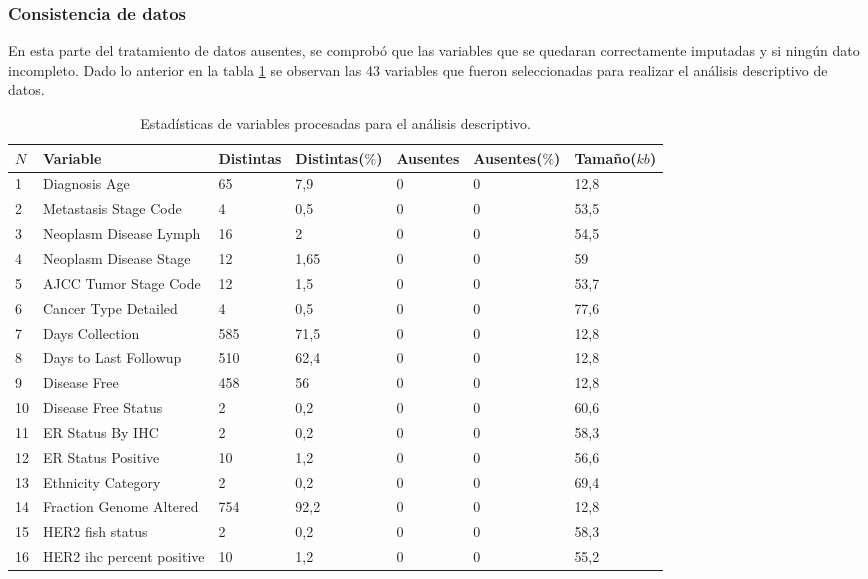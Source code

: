 \subsubsection{Consistencia de datos}
En esta parte del tratamiento de datos ausentes, se comprobó que las variables que se quedaran correctamente imputadas y si ningún dato incompleto. Dado lo anterior en la tabla \ref{data_limpia} se observan las 43 variables que fueron seleccionadas para realizar el análisis descriptivo de datos.
\begin{table}[hbt!]
	\footnotesize
	\centering
	\begin{threeparttable}
		\caption{Estadísticas de variables procesadas para el análisis descriptivo.}
		\label{data_limpia}
		\begin{tabular}{p{0.5cm} p{4cm} p{1.5cm} p{2cm} p{1.5cm} p{2cm} p{1.5cm}} \toprule
			$N$  &Variable &Distintas &Distintas($\%$) &Ausentes &Ausentes($\%$)  &Tamaño($kb$)
			\\ \hline	1	&	Diagnosis Age	&	65	&	7,9	&	0	&	0	&	12,8
			\\ \hline	2	&	Metastasis Stage Code	&	4	&	0,5	&	0	&	0	&	53,5
			\\ \hline	3	&	Neoplasm Disease Lymph 	&	16	&	2	&	0	&	0	&	54,5
			\\ \hline	4	&	Neoplasm Disease Stage 	&	12	&	1,65	&	0	&	0	&	59
			\\ \hline	5	&	AJCC Tumor Stage Code	&	12	&	1,5	&	0	&	0	&	53,7
			\\ \hline	6	&	Cancer Type Detailed	&	4	&	0,5	&	0	&	0	&	77,6
			\\ \hline	7	&	Days Collection	&	585	&	71,5	&	0	&	0	&	12,8
			\\ \hline	8	&	Days to Last Followup	&	510	&	62,4	&	0	&	0	&	12,8
			\\ \hline	9	&	Disease Free      	&	458	&	56	&	0	&	0	&	12,8
			\\ \hline	10	&	Disease Free Status	&	2	&	0,2	&	0	&	0	&	60,6
			\\ \hline	11	&	ER Status By IHC	&	2	&	0,2	&	0	&	0	&	58,3
			\\ \hline	12	&	ER Status Positive	&	10	&	1,2	&	0	&	0	&	56,6
			\\ \hline	13	&	Ethnicity Category	&	2	&	0,2	&	0	&	0	&	69,4
			\\ \hline	14	&	Fraction Genome Altered	&	754	&	92,2	&	0	&	0	&	12,8
			\\ \hline	15	&	HER2 fish status	&	2	&	0,2	&	0	&	0	&	58,3
			\\ \hline	16	&	HER2 ihc percent positive	&	10	&	1,2	&	0	&	0	&	55,2

\end{tabular}
\end{threeparttable}
\end{table}
